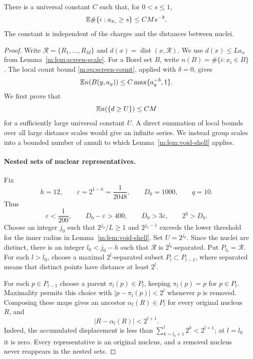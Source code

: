 \begin{lemma}\label{m:lem:void-count}
There is a universal constant $C$ such that, for $0<s\le 1$,
\begin{equation}\label{m:eq:void-count}
 \mathbb E\#\{i:a_{x_i}\ge s\}\le CMs^{-3}.
\end{equation}
The constant is independent of the charges and the distances between
nuclei.
\end{lemma}

\begin{proof}
Write $\mathcal R=\{R_1,\ldots,R_M\}$ and
$d(x)=\operatorname{dist}(x,\mathcal R)$. We use
$d(x)\le L a_x$ from Lemma~\ref{m:lem:screen-scale}. For a Borel set $B$, write
$n(B)=\#\{i:x_i\in B\}$. The local count bound
\eqref{m:eq:screen-count}, applied with $\delta=0$, gives
\begin{equation}\label{m:eq:void-net-local-count}
 \mathbb E n(B(y,a_y))
 \le C\max\{a_y^{-3},1\}.
\end{equation}
We first prove that
\begin{equation}\label{m:eq:void-net-far-count}
 \mathbb E n(\{d\ge U\})\le CM
\end{equation}
for a sufficiently large universal constant $U$. A direct summation of
local bounds over all large distance scales would give an infinite
series. We instead group scales into a bounded number of annuli to which
Lemma~\ref{m:lem:void-shell} applies.

\paragraph{Nested sets of nuclear representatives.}
Fix
\[
 h=12,\qquad \varepsilon=2^{1-h}=\frac1{2048},\qquad
 D_0=1000,\qquad q=10.
\]
Thus
\[
 \varepsilon<\frac1{200},\qquad D_0-\varepsilon>400,
 \qquad D_0>3\varepsilon,\qquad 2^q>D_0.
\]
Choose an integer $j_0$ such that $2^{j_0}/L\ge1$ and
$2^{j_0-1}$ exceeds the lower threshold for the inner radius in
Lemma~\ref{m:lem:void-shell}. Set $U=2^{j_0}$.
Since the nuclei are distinct, there is an integer $l_0<j_0-h$ such that
$\mathcal R$ is $2^{l_0}$-separated. Put $P_{l_0}=\mathcal R$.
For each $l>l_0$, choose a maximal $2^l$-separated subset
$P_l\subset P_{l-1}$, where separated means that distinct points have
distance at least $2^l$.

For each $p\in P_{l-1}$ choose a parent $\pi_l(p)\in P_l$, keeping
$\pi_l(p)=p$ for $p\in P_l$. Maximality permits this choice with
$|p-\pi_l(p)|<2^l$ whenever $p$ is removed. Composing these maps gives
an ancestor $\alpha_l(R)\in P_l$ for every original nucleus $R$, and
\begin{equation}\label{m:eq:void-net-ancestor-offset}
 |R-\alpha_l(R)|<2^{l+1}.
\end{equation}
Indeed, the accumulated displacement is less than
$\sum_{k=l_0+1}^l2^k<2^{l+1}$; at $l=l_0$ it is zero.
Every representative is an original nucleus, and a removed nucleus never
reappears in the nested sets.


\end{proof}
